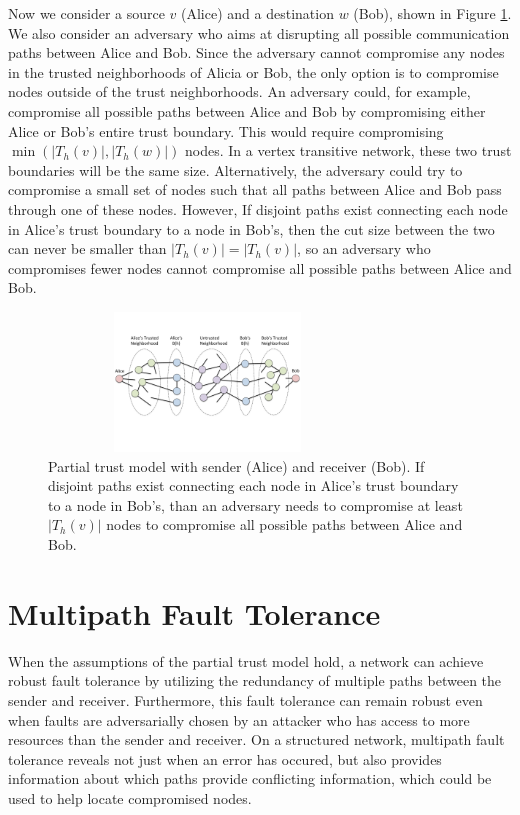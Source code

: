 \documentclass{sig-alternate-05-2015}
\begin{document}
Now we consider a source $v$ (Alice) and a destination $w$ (Bob),
shown in Figure \ref{fig:trust-source-destionation}. We also consider an adversary who aims at disrupting all possible communication paths between Alice and Bob. Since the adversary cannot compromise any nodes in the trusted neighborhoods of Alicia or Bob, the only option is to compromise nodes outside of the trust neighborhoods. An adversary could, for example, compromise all possible paths between Alice and Bob by compromising either Alice or Bob's entire trust boundary. This would require compromising $\min(|T_h(v)|, |T_h(w)|)$ nodes. In a vertex transitive network, these two trust boundaries will be the same size. Alternatively, the adversary could try to compromise a small set of nodes such that all paths between Alice and Bob pass through one of these nodes. However, If disjoint paths exist connecting each node in Alice's trust boundary to
a node in Bob's, then the cut size between the two can never be smaller than
$|T_h(v)| = |T_h(v)|$, so an adversary who compromises fewer nodes cannot compromise all possible paths between Alice and Bob.

\begin{figure}
\centerline{\includegraphics[width=3.33in,height=1.46in]{fig-bob_Alice_trusted_neigh2}}
\caption{
Partial trust model with sender (Alice) and receiver (Bob).
If disjoint paths exist connecting each node in Alice's trust boundary to
a node in Bob's,
than an adversary needs to compromise at least $|T_h(v)|$ nodes to
compromise all possible paths between Alice and Bob.
}
\label{fig:trust-source-destionation}
\end{figure}

\section{Multipath Fault Tolerance}

When the assumptions of the partial trust model hold, a network can achieve
robust fault tolerance by utilizing the redundancy of multiple paths
between the sender and receiver.
Furthermore, this fault tolerance can remain robust even when faults are
adversarially chosen by an attacker who has access to more resources
than the sender and receiver.
On a structured network, multipath fault tolerance reveals not just when
an error has occured, but also provides information about which paths provide
conflicting information,
which could be used to help locate compromised nodes.
\end{document}
